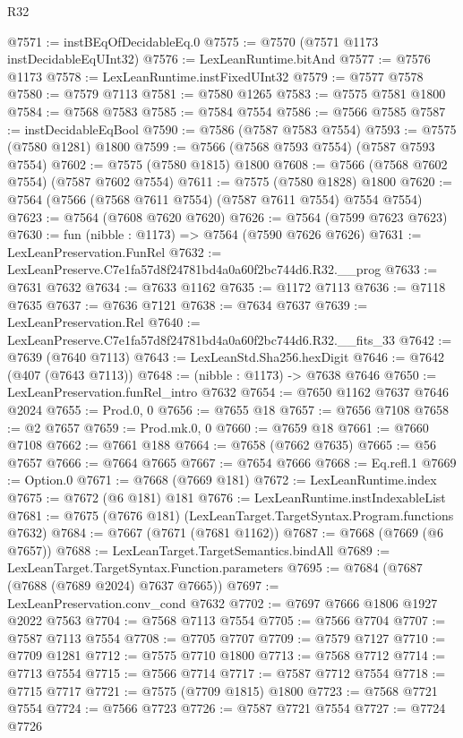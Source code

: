 \begin{lexlean}{R32}
\begin{coremodule}
@7571 := instBEqOfDecidableEq.{0}
@7575 := @7570 (@7571 @1173 instDecidableEqUInt32)
@7576 := LexLeanRuntime.bitAnd
@7577 := @7576 @1173
@7578 := LexLeanRuntime.instFixedUInt32
@7579 := @7577 @7578
@7580 := @7579 @7113
@7581 := @7580 @1265
@7583 := @7575 @7581 @1800
@7584 := @7568 @7583
@7585 := @7584 @7554
@7586 := @7566 @7585
@7587 := instDecidableEqBool
@7590 := @7586 (@7587 @7583 @7554)
@7593 := @7575 (@7580 @1281) @1800
@7599 := @7566 (@7568 @7593 @7554) (@7587 @7593 @7554)
@7602 := @7575 (@7580 @1815) @1800
@7608 := @7566 (@7568 @7602 @7554) (@7587 @7602 @7554)
@7611 := @7575 (@7580 @1828) @1800
@7620 := @7564 (@7566 (@7568 @7611 @7554) (@7587 @7611 @7554) @7554 @7554)
@7623 := @7564 (@7608 @7620 @7620)
@7626 := @7564 (@7599 @7623 @7623)
@7630 := fun (nibble : @1173) => @7564 (@7590 @7626 @7626)
@7631 := LexLeanPreservation.FunRel
@7632 := LexLeanPreserve.C7e1fa57d8f24781bd4a0a60f2bc744d6.R32.__prog
@7633 := @7631 @7632
@7634 := @7633 @1162
@7635 := @1172 @7113
@7636 := @7118 @7635
@7637 := @7636 @7121
@7638 := @7634 @7637
@7639 := LexLeanPreservation.Rel
@7640 := LexLeanPreserve.C7e1fa57d8f24781bd4a0a60f2bc744d6.R32.__fits_33
@7642 := @7639 (@7640 @7113)
@7643 := LexLeanStd.Sha256.hexDigit
@7646 := @7642 (@407 (@7643 @7113))
@7648 := (nibble : @1173) -> @7638 @7646
@7650 := LexLeanPreservation.funRel_intro @7632
@7654 := @7650 @1162 @7637 @7646 @2024
@7655 := Prod.{0, 0}
@7656 := @7655 @18
@7657 := @7656 @7108
@7658 := @2 @7657
@7659 := Prod.mk.{0, 0}
@7660 := @7659 @18
@7661 := @7660 @7108
@7662 := @7661 @188
@7664 := @7658 (@7662 @7635)
@7665 := @56 @7657
@7666 := @7664 @7665
@7667 := @7654 @7666
@7668 := Eq.refl.{1}
@7669 := Option.{0}
@7671 := @7668 (@7669 @181)
@7672 := LexLeanRuntime.index
@7675 := @7672 (@6 @181) @181
@7676 := LexLeanRuntime.instIndexableList
@7681 := @7675 (@7676 @181) (LexLeanTarget.TargetSyntax.Program.functions @7632)
@7684 := @7667 (@7671 (@7681 @1162))
@7687 := @7668 (@7669 (@6 @7657))
@7688 := LexLeanTarget.TargetSemantics.bindAll
@7689 := LexLeanTarget.TargetSyntax.Function.parameters
@7695 := @7684 (@7687 (@7688 (@7689 @2024) @7637 @7665))
@7697 := LexLeanPreservation.conv_cond @7632
@7702 := @7697 @7666 @1806 @1927 @2022 @7563
@7704 := @7568 @7113 @7554
@7705 := @7566 @7704
@7707 := @7587 @7113 @7554
@7708 := @7705 @7707
@7709 := @7579 @7127
@7710 := @7709 @1281
@7712 := @7575 @7710 @1800
@7713 := @7568 @7712
@7714 := @7713 @7554
@7715 := @7566 @7714
@7717 := @7587 @7712 @7554
@7718 := @7715 @7717
@7721 := @7575 (@7709 @1815) @1800
@7723 := @7568 @7721 @7554
@7724 := @7566 @7723
@7726 := @7587 @7721 @7554
@7727 := @7724 @7726

\end{coremodule}
\end{lexlean}
